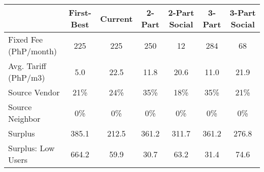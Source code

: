 \begin{tabular}{lcccccc}
  & First-Best & Current & 2-Part  & 2-Part Social  & 3-Part & 3-Part Social \\
\hline
\hline
Fixed Fee (PhP/month) &225&225&250&12&284&68\\
Avg. Tariff (PhP/m3) &5.0&22.5&11.8&20.6&11.0&21.9\\
Source Vendor &21\% &24\% &35\% &18\% &35\% &21\%\\
Source Neighbor &0\% &0\% &0\% &0\% &0\% &0\%\\
Surplus &385.1&212.5&361.2&311.7&361.2&276.8\\
Surplus: Low Users &664.2&59.9&30.7&63.2&31.4&74.6\\
\hline
\end{tabular}
